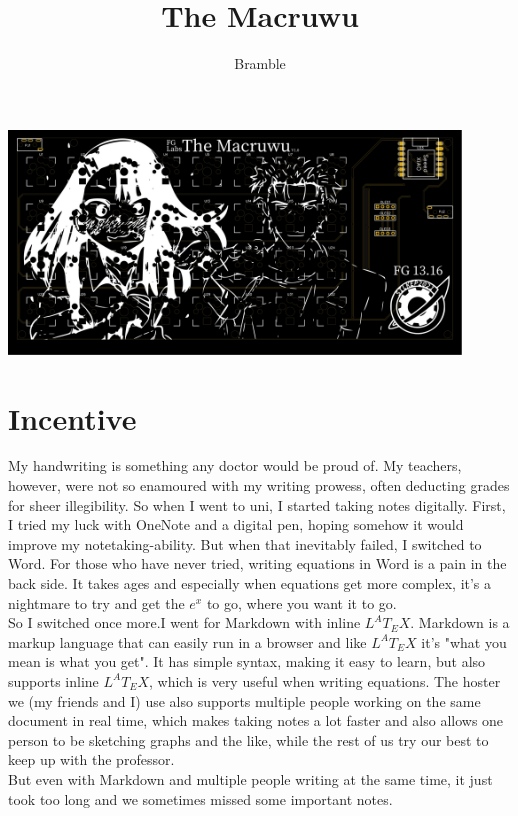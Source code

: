 \documentclass[english, 12pt]{scrartcl}
\title{\fontfamily{}\selectfont The Macruwu}
\author{Bramble}
\date{}
\begin{document}
	\maketitle
	\includegraphics[width=0.9\textwidth]{Macruwu PCB_5}
	\tableofcontents
	\newpage
	\section{Incentive}
	My handwriting is something any doctor would be proud of. My teachers, however, were not so enamoured with my writing prowess, often deducting grades for sheer illegibility. So when I went to uni, I started taking notes digitally. First, I tried my luck with OneNote and a digital pen, hoping somehow it would improve my notetaking-ability. But when that inevitably failed, I switched to Word. For those who have never tried, writing equations in Word is a pain in the back side. It takes ages and especially when equations get more complex, it's a nightmare to try and get the $e^{x}$ to go, where you want it to go.\\
	So I switched once more.I went for Markdown with inline $L^AT_EX$. Markdown is a markup language that can easily run in a browser and like $L^AT_EX$ it's "what you mean is what you get". It has simple syntax, making it easy to learn, but also supports inline $L^AT_EX$, which is very useful when writing equations. The hoster we (my friends and I) use also supports multiple people working on the same document in real time, which makes taking notes a lot faster and also allows one person to be sketching graphs and the like, while the rest of us try our best to keep up with the professor.\\
	But even with Markdown and multiple people writing at the same time, it just took too long and we sometimes missed some important notes.\\
\end{document}

